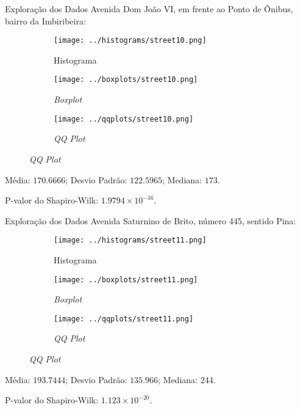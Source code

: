 \begin{frame}{Exploração dos Dados}
Avenida Dom João VI, em frente ao Ponto de Ônibus, bairro da Imbiribeira:
\begin{figure}
	\centering
	\begin{subfigure}{.33\textwidth}
		\centering
		\texttt{[image: ../histograms/street10.png]}
		\caption*{Histograma}
	\end{subfigure}%
	\begin{subfigure}{.33\textwidth}
		\centering
		\texttt{[image: ../boxplots/street10.png]}
		\caption*{\textit{Boxplot}}
	\end{subfigure}
	\begin{subfigure}{.32\textwidth}
		\centering
		\texttt{[image: ../qqplots/street10.png]}
		\caption*{\textit{QQ Plot}}
	\end{subfigure}
\end{figure}
Média: $170.6666$; Desvio Padrão: $122.5965$; Mediana: $173$.

P-valor do Shapiro-Wilk: $1.9794 \times 10^{-16}$.
\end{frame}

\begin{frame}{Exploração dos Dados}
Avenida Saturnino de Brito, número 445, sentido Pina:
\vskip 0.05cm
\begin{figure}
	\centering
	\begin{subfigure}{.33\textwidth}
		\centering
		\texttt{[image: ../histograms/street11.png]}
		\caption*{Histograma}
	\end{subfigure}%
	\begin{subfigure}{.33\textwidth}
		\centering
		\texttt{[image: ../boxplots/street11.png]}
		\caption*{\textit{Boxplot}}
	\end{subfigure}
	\begin{subfigure}{.32\textwidth}
		\centering
		\texttt{[image: ../qqplots/street11.png]}
		\caption*{\textit{QQ Plot}}
	\end{subfigure}
\end{figure}
\vskip 0.05cm
Média: $193.7444$; Desvio Padrão: $135.966$; Mediana: $244$.

P-valor do Shapiro-Wilk: $1.123 \times 10^{-20}$.
\end{frame}

